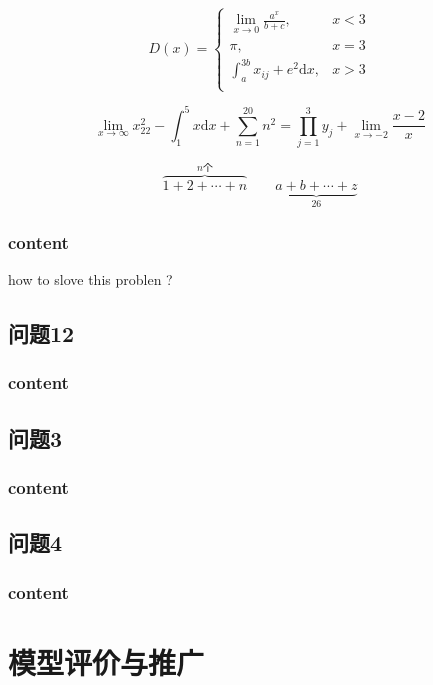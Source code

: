 \documentclass{MathorCupmodeling}
\begin{document}
\begin{equation}
D(x) = \begin{cases}
\lim\limits_{x \to 0} \frac{a^x}{b+c}, & x<3 \\
\pi, & x=3 \\
\int_a^{3b}x_{ij}+e^2 \mathrm{d}x,& x>3 \\
\end{cases}  \label{zz}
\end{equation}

\begin{equation}
\lim_{x \to \infty} x^2_{22} - \int_{1}^{5}x\mathrm{d}x + \sum_{n=1}^{20} n^{2} = \prod_{j=1}^{3} y_{j}  + \lim_{x \to -2} \frac{x-2}{x}  \label{pp}
\end{equation}

\begin{equation}
\overbrace{1+2+\cdots+n}^{n个} \qquad \underbrace{a+b+\cdots+z}_{26}  \label{qq}
\end{equation}


	\subsubsection{content}
\centering 
how to slove this problen ?\newline


	\subsection{问题12}
	\subsubsection{content}
	\subsection{问题3}
	\subsubsection{content}
	\subsection{问题4}
	\subsubsection{content}

	\section{模型评价与推广}
\end{document}
